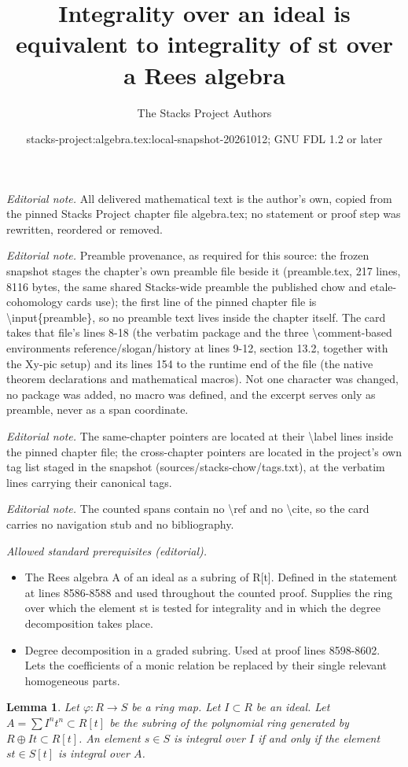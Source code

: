 \documentclass[10pt,a4paper]{amsart}
\title{Integrality over an ideal is equivalent to integrality of st over a Rees algebra}
\author{The Stacks Project Authors}
\date{stacks-project:algebra.tex:local-snapshot-20261012; GNU FDL 1.2 or later}
\theoremstyle{plain}
\newtheorem{lemma}[subsection]{Lemma}
\theoremstyle{definition}
\theoremstyle{remark}
\numberwithin{equation}{subsection}
\begin{document}
\maketitle
\noindent\textit{Editorial note.} All delivered mathematical text is the author's own, copied from the pinned Stacks Project chapter file algebra.tex; no statement or proof step was rewritten, reordered or removed.\par\medskip
\noindent\textit{Editorial note.} Preamble provenance, as required for this source: the frozen snapshot stages the chapter's own preamble file beside it (preamble.tex, 217 lines, 8116 bytes, the same shared Stacks-wide preamble the published chow and etale-cohomology cards use); the first line of the pinned chapter file is \textbackslash{}input\{preamble\}, so no preamble text lives inside the chapter itself. The card takes that file's lines 8-18 (the verbatim package and the three \textbackslash{}comment-based environments reference/slogan/history at lines 9-12, section 13.2, together with the Xy-pic setup) and its lines 154 to the runtime end of the file (the native theorem declarations and mathematical macros). Not one character was changed, no package was added, no macro was defined, and the excerpt serves only as preamble, never as a span coordinate.\par\medskip
\noindent\textit{Editorial note.} The same-chapter pointers are located at their \textbackslash{}label lines inside the pinned chapter file; the cross-chapter pointers are located in the project's own tag list staged in the snapshot (sources/stacks-chow/tags.txt), at the verbatim lines carrying their canonical tags.\par\medskip
\noindent\textit{Editorial note.} The counted spans contain no \textbackslash{}ref and no \textbackslash{}cite, so the card carries no navigation stub and no bibliography.\par\medskip
\noindent\textit{Allowed standard prerequisites (editorial).}\begin{itemize}
\item The Rees algebra A of an ideal as a subring of R[t]. Defined in the statement at lines 8586-8588 and used throughout the counted proof. Supplies the ring over which the element st is tested for integrality and in which the degree decomposition takes place.
\item Degree decomposition in a graded subring. Used at proof lines 8598-8602. Lets the coefficients of a monic relation be replaced by their single relevant homogeneous parts.
\end{itemize}\medskip
\begin{lemma}
\label{lemma-characterize-integral-ideal}
Let $\varphi : R \to S$ be a ring map.
Let $I \subset R$ be an ideal.
Let $A = \sum I^nt^n \subset R[t]$ be the
subring of the polynomial ring
generated by $R \oplus It \subset R[t]$.
An element $s \in S$ is integral over $I$ if
and only if the element $st \in S[t]$
is integral over $A$.
\end{lemma}
\end{document}
